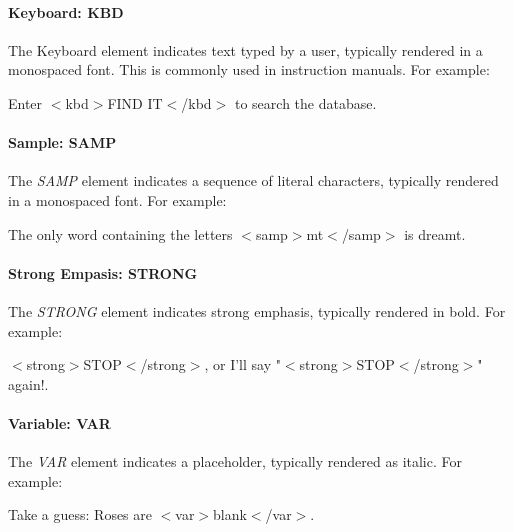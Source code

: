 \paragraph*{Keyboard:  KBD}\par 
The Keyboard element indicates text typed by a user, typically
rendered in a monospaced font.  This is commonly used in instruction
manuals.  For example:
\par Enter $<$kbd$>$FIND IT$<$/kbd$>$ to search the database.
\paragraph*{Sample:  SAMP}\par 
The {\it SAMP} element indicates a sequence of literal characters,
typically rendered in a monospaced font.  For example:
\par The only word containing the letters $<$samp$>$mt$<$/samp$>$ is dreamt.
\paragraph*{Strong Empasis:  STRONG}\par 
The {\it STRONG} element indicates strong emphasis,
typically rendered in bold.  For example:
\par $<$strong$>$STOP$<$/strong$>$, or I'll say "$<$strong$>$STOP$<$/strong$>$" again!.
\paragraph*{Variable:  VAR}\par 
The {\it VAR} element indicates a placeholder, typically rendered
as italic.  For example:
\par Take a guess: Roses are $<$var$>$blank$<$/var$>$.
